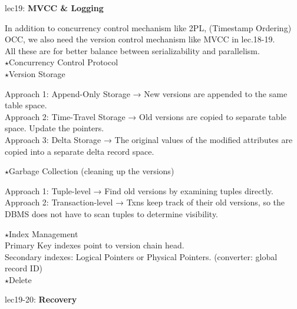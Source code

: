 \documentclass[letterpaper,11pt]{exam}
\begin{document}
lec19: \textbf{MVCC \& Logging}
\begin{spacing}{1.2}
  In addition to concurrency control mechanism like 2PL, (Timestamp Ordering) OCC, we also need the version control mechanism like MVCC in lec.18-19. \\ 
  All these are for better balance between serializability and parallelism. \\
  $\star$Concurrency Control Protocol \\
  $\star$Version Storage \\
  \begin{adjustwidth}{2em}{0pt}
  Approach 1: Append-Only Storage → New versions are appended to the same table space. \\
  Approach 2: Time-Travel Storage → Old versions are copied to separate table space. Update the pointers. \\
  Approach 3: Delta Storage → The original values of the modified attributes are copied into a separate delta record space. \\
  \end{adjustwidth}
  $\star$Garbage Collection (cleaning up the versions) \\
  \begin{adjustwidth}{2em}{0pt}
  Approach 1: Tuple-level → Find old versions by examining tuples directly.\\
  Approach 2: Transaction-level → Txns keep track of their old versions, so the DBMS does not have to scan tuples to determine visibility. \\
  \end{adjustwidth}
  $\star$Index Management \\
  Primary Key indexes point to version chain head. \\
  Secondary indexes: Logical Pointers or Physical Pointers. (converter: global record ID)\\ 
  $\star$Delete \\
\end{spacing}

\vspace*{0em}

lec19-20: \textbf{Recovery} \\
\end{document}

